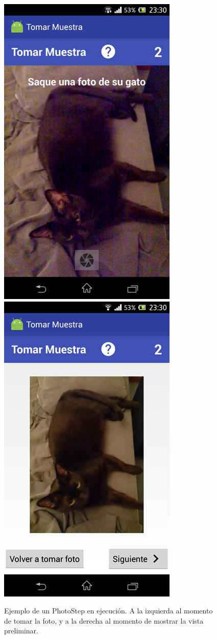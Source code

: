 \begin{figure}[H]
  \centering
    \includegraphics[scale=0.4]{05-implementacion/PhotoStep1.png} 
    \includegraphics[scale=0.4]{05-implementacion/PhotoStep2.png}     
   \caption{Ejemplo de un PhotoStep en ejecución. A la izquierda al momento de tomar la foto, y a la derecha al momento de mostrar la vista preliminar.}
   \label{fig:imgPhotoStep}
\end{figure}


